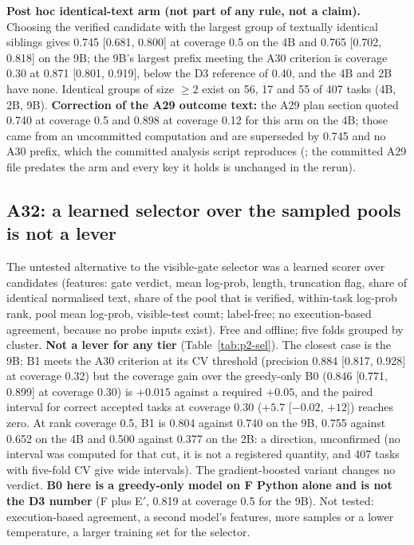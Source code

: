 \documentclass[11pt,a4paper]{article}
\newcommand{\code}[1]{\texttt{\detokenize{#1}}}
\begin{document}
\textbf{Post hoc identical-text arm (not part of any rule, not a claim).} Choosing the verified candidate with the largest group of textually identical siblings gives 0.745 [0.681, 0.800] at coverage 0.5 on the 4B and 0.765 [0.702, 0.818] on the 9B; the 9B's largest prefix meeting the A30 criterion is coverage 0.30 at 0.871 [0.801, 0.919], below the D3 reference of 0.40, and the 4B and 2B have none. Identical groups of size $\ge2$ exist on 56, 17 and 55 of 407 tasks (4B, 2B, 9B). \textbf{Correction of the A29 outcome text:} the A29 plan section quoted 0.740 at coverage 0.5 and 0.898 at coverage 0.12 for this arm on the 4B; those came from an uncommitted computation and are superseded by 0.745 and no A30 prefix, which the committed analysis script reproduces (\code{phase2_A29_rerun_A30script.json}; the committed A29 file predates the arm and every key it holds is unchanged in the rerun).

\subsection{A32: a learned selector over the sampled pools is not a lever}\label{sec:p2-sel}

The untested alternative to the visible-gate selector was a learned scorer over candidates (features: gate verdict, mean log-prob, length, truncation flag, share of identical normalised text, share of the pool that is verified, within-task log-prob rank, pool mean log-prob, visible-test count; label-free; no execution-based agreement, because no probe inputs exist). Free and offline; five folds grouped by cluster. \textbf{Not a lever for any tier} (Table~\ref{tab:p2-sel}). The closest case is the 9B: B1 meets the A30 criterion at its CV threshold (precision 0.884 [0.817, 0.928] at coverage 0.32) but the coverage gain over the greedy-only B0 (0.846 [0.771, 0.899] at coverage 0.30) is $+0.015$ against a required $+0.05$, and the paired interval for correct accepted tasks at coverage 0.30 ($+5.7$ [$-0.02$, $+12$]) reaches zero. At rank coverage 0.5, B1 is 0.804 against 0.740 on the 9B, 0.755 against 0.652 on the 4B and 0.500 against 0.377 on the 2B: a direction, unconfirmed (no interval was computed for that cut, it is not a registered quantity, and 407 tasks with five-fold CV give wide intervals). The gradient-boosted variant changes no verdict. \textbf{B0 here is a greedy-only model on F Python alone and is not the D3 number} (F plus E$'$, 0.819 at coverage 0.5 for the 9B). Not tested: execution-based agreement, a second model's features, more samples or a lower temperature, a larger training set for the selector.
\end{document}

